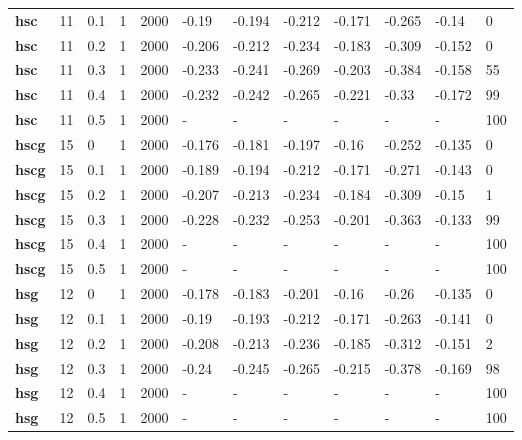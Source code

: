 \begin{longtable}[h]{|p{0.8cm}|p{1.5cm}|p{1cm}|p{1cm}|p{1cm}|p{1cm}|p{1cm}|p{1cm}|p{1cm}|p{1cm}|p{1cm}|p{1.5cm}|}
           \\
  \textbf{hsc } &  11         & 0.1 & 1 & 2000 &  -0.19 & -0.194 & -0.212 & -0.171 & -0.265 &  -0.14 &   0
           \\
  \textbf{hsc } &  11         & 0.2 & 1 & 2000 & -0.206 & -0.212 & -0.234 & -0.183 & -0.309 & -0.152 &   0
           \\
  \textbf{hsc } &  11         & 0.3 & 1 & 2000 & -0.233 & -0.241 & -0.269 & -0.203 & -0.384 & -0.158 &  55
           \\
  \textbf{hsc } &  11         & 0.4 & 1 & 2000 & -0.232 & -0.242 & -0.265 & -0.221 &  -0.33 & -0.172 &  99
           \\
  \textbf{hsc } &  11         & 0.5 & 1 & 2000 & - & - & - & - & - & - & 100
           \\
  \textbf{hscg} &  15         &   0 & 1 & 2000 & -0.176 & -0.181 & -0.197 &  -0.16 & -0.252 & -0.135 &   0
           \\
  \textbf{hscg} &  15         & 0.1 & 1 & 2000 & -0.189 & -0.194 & -0.212 & -0.171 & -0.271 & -0.143 &   0
           \\
  \textbf{hscg} &  15         & 0.2 & 1 & 2000 & -0.207 & -0.213 & -0.234 & -0.184 & -0.309 &  -0.15 &   1
           \\
  \textbf{hscg} &  15         & 0.3 & 1 & 2000 & -0.228 & -0.232 & -0.253 & -0.201 & -0.363 & -0.133 &  99
           \\
  \textbf{hscg} &  15         & 0.4 & 1 & 2000 & - & - & - & - & - & - & 100
           \\
  \textbf{hscg} &  15         & 0.5 & 1 & 2000 & - & - & - & - & - & - & 100
           \\
  \textbf{hsg } &  12         &   0 & 1 & 2000 & -0.178 & -0.183 & -0.201 &  -0.16 &  -0.26 & -0.135 &   0
           \\
  \textbf{hsg } &  12         & 0.1 & 1 & 2000 &  -0.19 & -0.193 & -0.212 & -0.171 & -0.263 & -0.141 &   0
           \\
  \textbf{hsg } &  12         & 0.2 & 1 & 2000 & -0.208 & -0.213 & -0.236 & -0.185 & -0.312 & -0.151 &   2
           \\
  \textbf{hsg } &  12         & 0.3 & 1 & 2000 &  -0.24 & -0.245 & -0.265 & -0.215 & -0.378 & -0.169 &  98
           \\
  \textbf{hsg } &  12         & 0.4 & 1 & 2000 & - & - & - & - & - & - & 100
           \\
  \textbf{hsg } &  12         & 0.5 & 1 & 2000 & - & - & - & - & - & - & 100
           \\
 \end{longtable}
